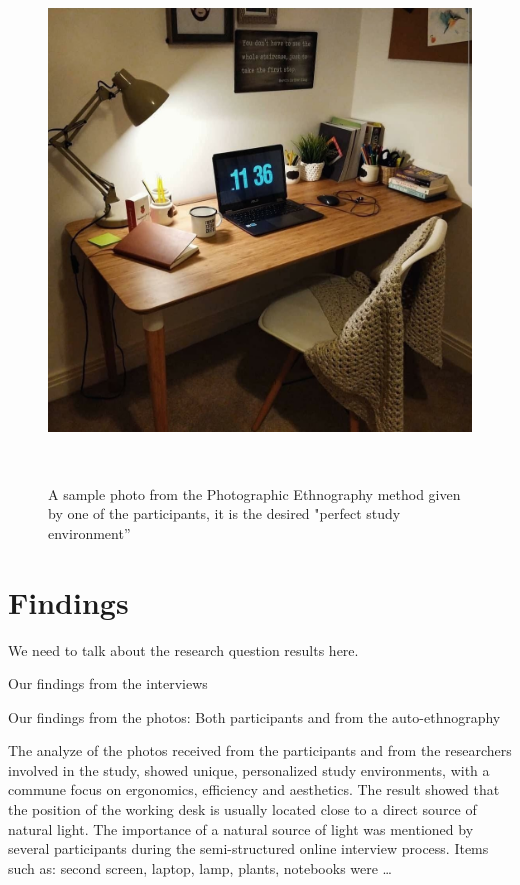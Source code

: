 \documentclass{sigchi}
\begin{document}
\begin{figure}
\centering
  \includegraphics[width=1\columnwidth]{figures/perfect-setup}
  \caption{A sample photo from the Photographic Ethnography method given by one of the participants, it is the desired "perfect study environment''}~\label{fig:figure2}
\end{figure}

\section{Findings}

We need to talk about the research question results here.

Our findings from the interviews

Our findings from the photos: Both participants and from the auto-ethnography 

The analyze of the photos received from the participants and from the researchers involved in the study, showed unique, personalized study environments,  with a commune focus on ergonomics, efficiency and aesthetics. The result showed that the position of the working desk is usually located close to a direct source of natural light.  The importance of a natural source of light was mentioned by several participants during the semi-structured online interview process. Items such as: second screen, laptop, lamp, plants, notebooks were … 
\end{document}
